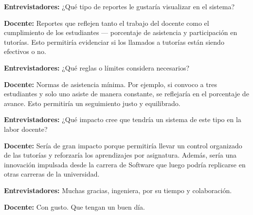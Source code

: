\noindent\textbf{Entrevistadores:} ¿Qué tipo de reportes le gustaría visualizar en el sistema?\par\smallskip

\noindent\textbf{Docente:} Reportes que reflejen tanto el trabajo del docente como el cumplimiento de los estudiantes — porcentaje de asistencia y participación en tutorías. Esto permitiría evidenciar si los llamados a tutorías están siendo efectivos o no.\par\smallskip

\noindent\textbf{Entrevistadores:} ¿Qué reglas o límites considera necesarios?\par\smallskip

\noindent\textbf{Docente:} Normas de asistencia mínima. Por ejemplo, si convoco a tres estudiantes y solo uno asiste de manera constante, se reflejaría en el porcentaje de avance. Esto permitiría un seguimiento justo y equilibrado.\par\smallskip

\noindent\textbf{Entrevistadores:} ¿Qué impacto cree que tendría un sistema de este tipo en la labor docente?\par\smallskip

\noindent\textbf{Docente:} Sería de gran impacto porque permitiría llevar un control organizado de las tutorías y reforzaría los aprendizajes por asignatura. Además, sería una innovación impulsada desde la carrera de Software que luego podría replicarse en otras carreras de la universidad.\par\smallskip

\noindent\textbf{Entrevistadores:} Muchas gracias, ingeniera, por su tiempo y colaboración.\par\smallskip

\noindent\textbf{Docente:} Con gusto. Que tengan un buen día.\par\smallskip

\endgroup
